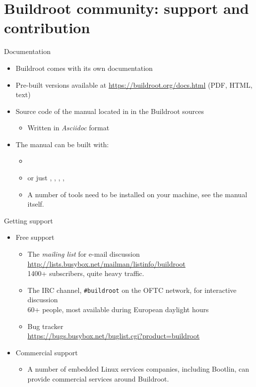 \section{Buildroot community: support and contribution}

\begin{frame}{Documentation}
  \begin{itemize}
  \item Buildroot comes with its own documentation
  \item Pre-built versions available at
    \url{https://buildroot.org/docs.html} (PDF, HTML, text)
  \item Source code of the manual located in  in the
    Buildroot sources
    \begin{itemize}
    \item Written in {\em Asciidoc} format
    \end{itemize}
  \item The manual can be built with:
    \begin{itemize}
    \item {}
    \item or just , ,
      , , 
    \item A number of tools need to be installed on your machine,
      see the manual itself.
    \end{itemize}
  \end{itemize}
\end{frame}

\begin{frame}{Getting support}
  \begin{itemize}
  \item Free support
    \begin{itemize}
    \item The {\em mailing list} for e-mail discussion\\
      {\footnotesize \url{http://lists.busybox.net/mailman/listinfo/buildroot}}\\
      1400+ subscribers, quite heavy traffic.
    \item The IRC channel, {\tt \#buildroot} on the OFTC network,
      for interactive discussion\\
      60+ people, most available during European daylight hours
    \item Bug tracker\\
      \url{https://bugs.busybox.net/buglist.cgi?product=buildroot}
    \end{itemize}
  \item Commercial support
    \begin{itemize}
    \item A number of embedded Linux services companies, including
      Bootlin, can provide commercial services around
      Buildroot.
    \end{itemize}
  \end{itemize}
\end{frame}

